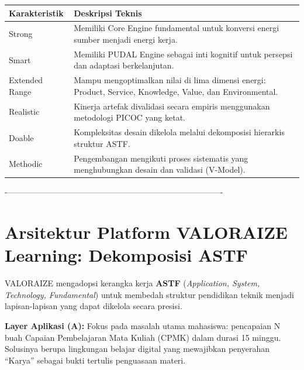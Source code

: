 \documentclass[
  letterpaper,
  DIV=11,
  numbers=noendperiod]{scrreprt}
\newcounter{none} %
\begin{document}
{\def\LTcaptype{none} %
\begin{longtable}[]{@{}
  >{\raggedright\arraybackslash}p{}
  >{\raggedright\arraybackslash}p{}@{}}
\toprule\noalign{}
\begin{minipage}[b]{\linewidth}\raggedright
Karakteristik
\end{minipage} & \begin{minipage}[b]{\linewidth}\raggedright
Deskripsi Teknis
\end{minipage} \\
\midrule\noalign{}
\endhead
\bottomrule\noalign{}
\endlastfoot
Strong & Memiliki Core Engine fundamental untuk konversi energi sumber
menjadi energi kerja. \\
Smart & Memiliki PUDAL Engine sebagai inti kognitif untuk persepsi dan
adaptasi berkelanjutan. \\
Extended Range & Mampu mengoptimalkan nilai di lima dimensi energi:
Product, Service, Knowledge, Value, dan Environmental. \\
Realistic & Kinerja artefak divalidasi secara empiris menggunakan
metodologi PICOC yang ketat. \\
Doable & Kompleksitas desain dikelola melalui dekomposisi hierarkis
struktur ASTF. \\
Methodic & Pengembangan mengikuti proses sistematis yang menghubungkan
desain dan validasi (V-Model). \\
\end{longtable}
}

-\/-------------------------------------------------------------------------------

\section{Arsitektur Platform VALORAIZE Learning: Dekomposisi
ASTF}\label{arsitektur-platform-valoraize-learning-dekomposisi-astf}

VALORAIZE mengadopsi kerangka kerja \textbf{ASTF} (\emph{Application,
System, Technology, Fundamental}) untuk membedah struktur pendidikan
teknik menjadi lapisan-lapisan yang dapat dikelola secara presisi.

\textbf{Layer Aplikasi (A):} Fokus pada masalah utama mahasiswa:
pencapaian N buah Capaian Pembelajaran Mata Kuliah (CPMK) dalam durasi
15 minggu. Solusinya berupa lingkungan belajar digital yang mewajibkan
penyerahan ``Karya'' sebagai bukti tertulis penguasaan materi.
\end{document}
